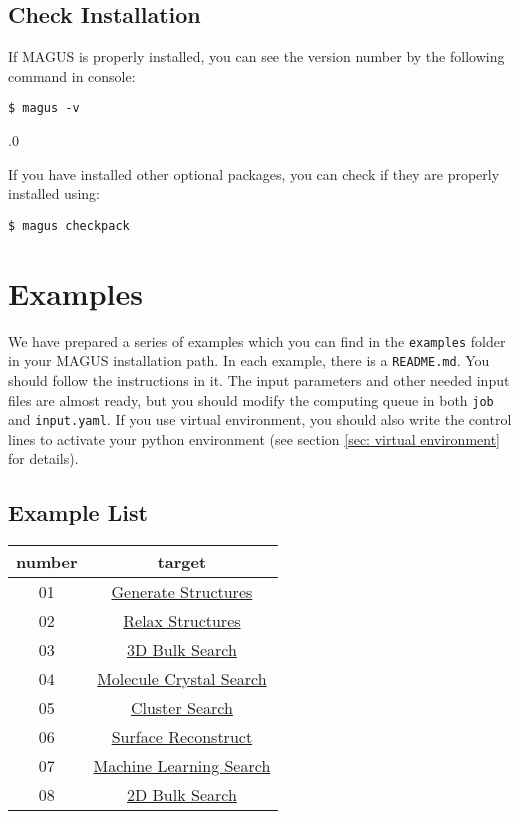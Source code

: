 \documentclass[12pt,oneside]{book}
\newcommand{\file}[1]{\texttt{#1}}
\begin{document}
\section{Check Installation}
If MAGUS is properly installed, you can see the version number by the following command in console:
\begin{tcolorbox}
    \begin{verbatim}
$ magus -v
    \end{verbatim}
.0
\end{tcolorbox}

If you have installed other optional packages, you can check if they are properly installed using:
\begin{tcolorbox}
    \begin{verbatim}
$ magus checkpack
    \end{verbatim}
\end{tcolorbox}

\chapter{Examples}
We have prepared a series of examples which you can find in the \file{examples} folder in your MAGUS installation path. In each example, there is a \file{README.md}. You should follow the instructions in it. The input parameters and other needed input files are almost ready, but you should modify the computing queue in both \file{job} and \file{input.yaml}. If you use virtual environment, you should also write the control lines to activate your python environment (see section \ref{sec: virtual environment} for details).
\section{Example List}
\begin{table}[h]
\centering
\begin{tabular}{c|c}
\hline
number &  target  \\ \hline
01     &  \hyperref[Generate Structures]{Generate Structures}\\
02     &  \hyperref[Relax Structures]{Relax Structures}\\
03     &  \hyperref[3D Bulk Search]{3D Bulk Search}\\
04     &  \hyperref[Molecule Crystal Search]{Molecule Crystal Search}\\
05     &  \hyperref[Cluster Search]{Cluster Search}\\
06     &  \hyperref[Surface Reconstruct]{Surface Reconstruct}\\
07     &  \hyperref[Machine Learning Search]{Machine Learning Search}\\
08     &  \hyperref[2D Bulk Search]{2D Bulk Search}\\ \hline
\end{tabular}
\end{table}
\end{document}
